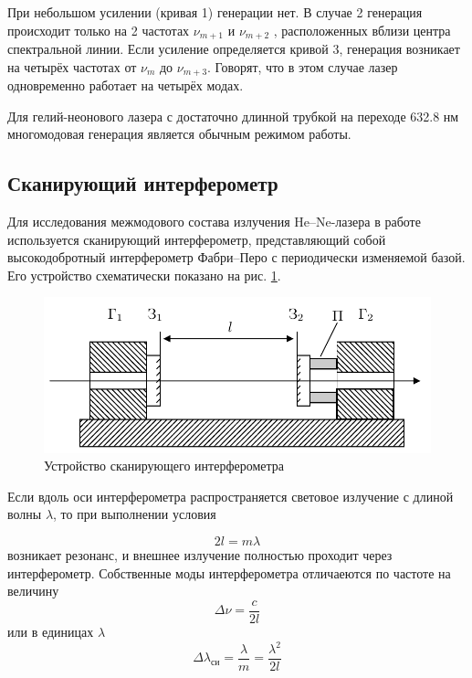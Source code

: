 \documentclass{article}
\begin{document}
При небольшом усилении (кривая 1) генерации нет. В случае 2 генерация происходит
только на 2 частотах $\nu_{m+1}$ и $\nu_{m+2}$ , расположенных вблизи центра
спектральной линии. Если усиление определяется кривой 3, генерация возникает на
четырёх частотах от $\nu_m$ до $\nu_{m+3}$. Говорят, что в этом случае лазер
одновременно работает на четырёх модах.

Для гелий-неонового лазера с достаточно длинной трубкой на переходе 632.8 нм
многомодовая генерация является обычным режимом работы.

\subsection{Сканирующий интерферометр}
Для исследования межмодового состава излучения He–Ne-лазера в работе используется
сканирующий интерферометр, представляющий собой высокодобротный интерферометр
Фабри–Перо с периодически изменяемой базой. Его устройство схематически показано
на рис. \ref{fig:interferometr}.
\newpage

\begin{figure}[h]
    \center\includegraphics[width = 0.6\linewidth]{interferometr.png}
    \caption{Устройство сканирующего интерферометра}\label{fig:interferometr}
\end{figure}

Если вдоль оси интерферометра распространяется световое излучение с длиной
волны $\lambda$, то при выполнении условия

\begin{equation}
    2l=m\lambda
    \label{eq:fabri_resonanse}
\end{equation}
возникает резонанс, и внешнее излучение полностью проходит через интерферометр.
Собственные моды интерферометра отличаеются по частоте на величину
\begin{equation}
    \Delta \nu = \frac{c}{2l}
    \label{eq:mode_distance_freq_fabri}
\end{equation}
или в единицах $\lambda$
\begin{equation}
    \Delta \lambda_{си} = \frac{\lambda}{m} = \frac{\lambda^2}{2l}
    \label{eq:mode_distance_lambda_fabri}
\end{equation}
\end{document}
